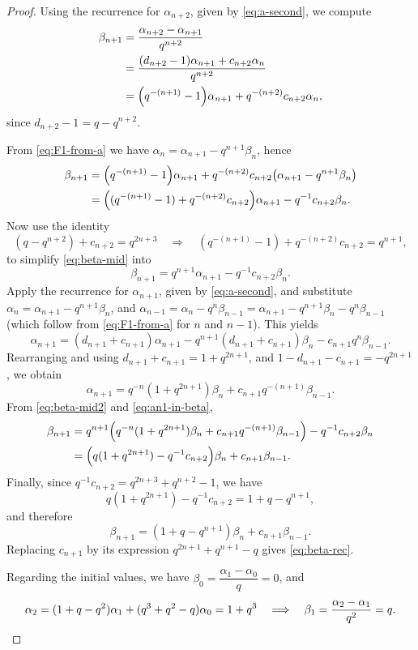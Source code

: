 \documentclass[letterpaper,12pt]{article}
\begin{document}
\begin{proof}
 
Using the recurrence for $\alpha_{n+2}$, given by \eqref{eq:a-second},  we compute
\begin{align*}
\beta_{n+1}
&=\frac{\alpha_{n+2}-\alpha_{n+1}}{q^{n+2}}
\\&=\frac{(d_{n+2}-1)\alpha_{n+1}+c_{n+2}\alpha_n}{q^{n+2}}\\
&=\Bigl(q^{-(n+1)}-1\Bigr)\alpha_{n+1}+q^{-(n+2)}c_{n+2}\alpha_n,
\end{align*}
since $d_{n+2}-1=q-q^{n+2}$.

 
From \eqref{eq:F1-from-a} we have $\alpha_n=\alpha_{n+1}-q^{n+1}\beta_n$, hence
\begin{align}
\beta_{n+1}
&=\Bigl(q^{-(n+1)}-1\Bigr)\alpha_{n+1}
+q^{-(n+2)}c_{n+2}\bigl(\alpha_{n+1}-q^{n+1}\beta_n\bigr)\notag\\
&=\Bigl((q^{-(n+1)}-1)+q^{-(n+2)}c_{n+2}\Bigr)\alpha_{n+1}-q^{-1}c_{n+2}\beta_n.
\label{eq:beta-mid}
\end{align}
Now use the identity
\[
(q-q^{n+2})+c_{n+2}=q^{2n+3}
\quad\Longrightarrow\quad
(q^{-(n+1)}-1)+q^{-(n+2)}c_{n+2}=q^{n+1},
\]
to simplify \eqref{eq:beta-mid} into
\begin{equation}\label{eq:beta-mid2}
\beta_{n+1}=q^{n+1}\alpha_{n+1}-q^{-1}c_{n+2}\beta_n.
\end{equation}
Apply the recurrence for $\alpha_{n+1}$, given by \eqref{eq:a-second}, and  substitute $\alpha_n=\alpha_{n+1}-q^{n+1}\beta_n$, and  $\alpha_{n-1}=\alpha_n-q^n\beta_{n-1}=\alpha_{n+1}-q^{n+1}\beta_n-q^n\beta_{n-1}$ (which follow from \eqref{eq:F1-from-a} for $n$ and $n-1$). This yields
\[
\alpha_{n+1}=(d_{n+1}+c_{n+1})\alpha_{n+1}-q^{n+1}(d_{n+1}+c_{n+1})\beta_n-c_{n+1}q^n\beta_{n-1}.
\]
Rearranging and using $d_{n+1}+c_{n+1}=1+q^{2n+1}$, and $1-d_{n+1}-c_{n+1}=-q^{2n+1}$, we obtain
\begin{equation}\label{eq:an1-in-beta}
\alpha_{n+1}=q^{-n}(1+q^{2n+1})\beta_n+c_{n+1}q^{-(n+1)}\beta_{n-1}.
\end{equation}
From \eqref{eq:beta-mid2} and \eqref{eq:an1-in-beta},
\begin{align*}
\beta_{n+1}
&=q^{n+1}\Bigl(q^{-n}(1+q^{2n+1})\beta_n+c_{n+1}q^{-(n+1)}\beta_{n-1}\Bigr)
-q^{-1}c_{n+2}\beta_n\\
&=\Bigl(q(1+q^{2n+1})-q^{-1}c_{n+2}\Bigr)\beta_n+c_{n+1}\beta_{n-1}.
\end{align*}
Finally, since $q^{-1}c_{n+2}=q^{2n+3}+q^{n+2}-1$, we have
\[
q(1+q^{2n+1})-q^{-1}c_{n+2}=1+q-q^{n+1},
\]
and therefore
\[
\beta_{n+1}=(1+q-q^{n+1})\beta_n+c_{n+1}\beta_{n-1}.
\]
Replacing $c_{n+1}$ by its expression $q^{2n+1}+q^{n+1}-q$ gives \eqref{eq:beta-rec}.

Regarding the initial values, we have  $\beta_0=\dfrac{\alpha_1-\alpha_0}{q}=0$, and 
\[
\alpha_2=(1+q-q^2)\alpha_1+(q^3+q^2-q)\alpha_0=1+q^3
\quad\Longrightarrow\quad
\beta_1=\frac{\alpha_2-\alpha_1}{q^2}=q.\qedhere
\]
\end{proof}
\end{document}
